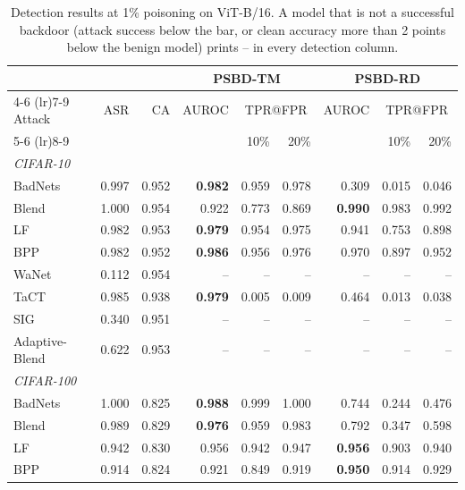 \begin{table}[htbp]
\centering
\small
\setlength{\tabcolsep}{4pt}
\caption{Detection results at 1\% poisoning on ViT-B/16. A model that is not a successful backdoor (attack success below the bar, or clean accuracy more than 2 points below the benign model) prints -- in every detection column.}
\label{tab:results-rate-1}
\begin{tabular}{lrrrrrrrr}
\toprule
 & & & \multicolumn{3}{c}{PSBD-TM} & \multicolumn{3}{c}{PSBD-RD} \\
\cmidrule(lr){4-6} \cmidrule(lr){7-9}
Attack & ASR & CA & AUROC & \multicolumn{2}{c}{TPR@FPR} & AUROC & \multicolumn{2}{c}{TPR@FPR} \\
\cmidrule(lr){5-6} \cmidrule(lr){8-9}
 & & & & 10\% & 20\% & & 10\% & 20\% \\
\midrule
\multicolumn{9}{l}{\textit{CIFAR-10}} \\
BadNets & 0.997 & 0.952 & \textbf{0.982} & 0.959 & 0.978 & 0.309 & 0.015 & 0.046 \\
Blend & 1.000 & 0.954 & 0.922 & 0.773 & 0.869 & \textbf{0.990} & 0.983 & 0.992 \\
LF & 0.982 & 0.953 & \textbf{0.979} & 0.954 & 0.975 & 0.941 & 0.753 & 0.898 \\
BPP & 0.982 & 0.952 & \textbf{0.986} & 0.956 & 0.976 & 0.970 & 0.897 & 0.952 \\
WaNet & 0.112 & 0.954 & -- & -- & -- & -- & -- & -- \\
TaCT & 0.985 & 0.938 & \textbf{0.979} & 0.005 & 0.009 & 0.464 & 0.013 & 0.038 \\
SIG & 0.340 & 0.951 & -- & -- & -- & -- & -- & -- \\
Adaptive-Blend & 0.622 & 0.953 & -- & -- & -- & -- & -- & -- \\
\midrule
\multicolumn{9}{l}{\textit{CIFAR-100}} \\
BadNets & 1.000 & 0.825 & \textbf{0.988} & 0.999 & 1.000 & 0.744 & 0.244 & 0.476 \\
Blend & 0.989 & 0.829 & \textbf{0.976} & 0.959 & 0.983 & 0.792 & 0.347 & 0.598 \\
LF & 0.942 & 0.830 & 0.956 & 0.942 & 0.947 & \textbf{0.956} & 0.903 & 0.940 \\
BPP & 0.914 & 0.824 & 0.921 & 0.849 & 0.919 & \textbf{0.950} & 0.914 & 0.929 \\

\end{tabular}
\end{table}
